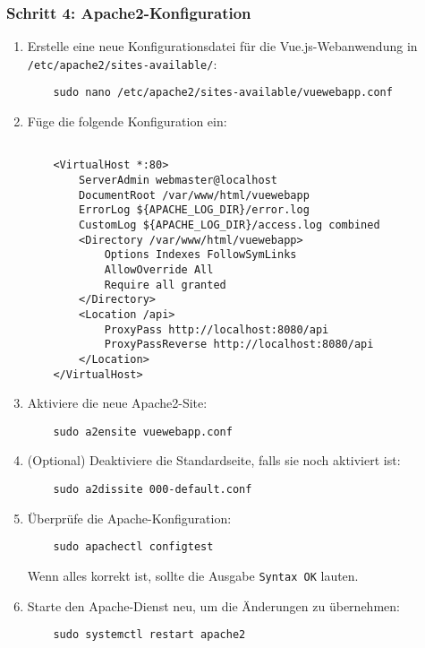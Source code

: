 \documentclass[a4paper,12pt]{article}
\begin{document}
\subsubsection{Schritt 4: Apache2-Konfiguration}
\begin{enumerate}
    \item Erstelle eine neue Konfigurationsdatei für die Vue.js-Webanwendung in \texttt{/etc/apache2/sites-available/}:

    \begin{lstlisting}
    sudo nano /etc/apache2/sites-available/vuewebapp.conf
    \end{lstlisting}
    
    \item Füge die folgende Konfiguration ein:
    
    \begin{lstlisting}

    <VirtualHost *:80>
        ServerAdmin webmaster@localhost
        DocumentRoot /var/www/html/vuewebapp
        ErrorLog ${APACHE_LOG_DIR}/error.log
        CustomLog ${APACHE_LOG_DIR}/access.log combined
        <Directory /var/www/html/vuewebapp>
            Options Indexes FollowSymLinks
            AllowOverride All
            Require all granted
        </Directory>
        <Location /api>
            ProxyPass http://localhost:8080/api
            ProxyPassReverse http://localhost:8080/api
        </Location>
    </VirtualHost>

    \end{lstlisting}
    
    \item Aktiviere die neue Apache2-Site:
    
    \begin{lstlisting}
    sudo a2ensite vuewebapp.conf
    \end{lstlisting}
    
    \item (Optional) Deaktiviere die Standardseite, falls sie noch aktiviert ist:
    
    \begin{lstlisting}
    sudo a2dissite 000-default.conf
    \end{lstlisting}
    
    \item Überprüfe die Apache-Konfiguration:
    
    \begin{lstlisting}
    sudo apachectl configtest
    \end{lstlisting}
    
    Wenn alles korrekt ist, sollte die Ausgabe \texttt{Syntax OK} lauten.

    \item Starte den Apache-Dienst neu, um die Änderungen zu übernehmen:
    
    \begin{lstlisting}
    sudo systemctl restart apache2
    \end{lstlisting}
\end{enumerate}
\end{document}
